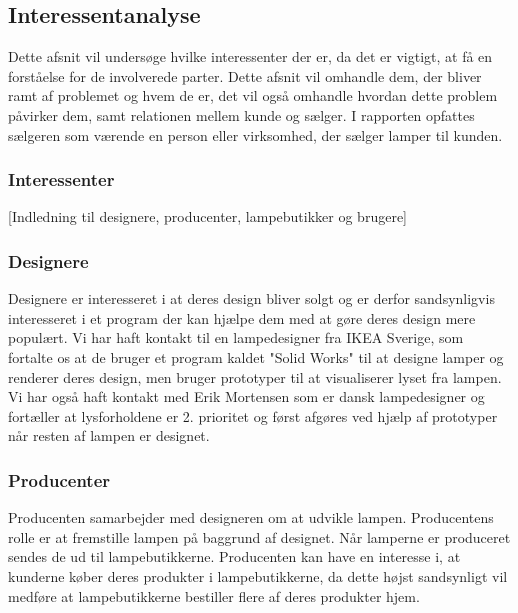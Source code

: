 \subsection{Interessentanalyse}
Dette afsnit vil undersøge hvilke interessenter der er, da det er vigtigt, at få en forståelse for de involverede parter. Dette afsnit vil omhandle dem, der bliver ramt af problemet og hvem de er, det vil også omhandle hvordan dette problem påvirker dem, samt relationen mellem kunde og sælger. I rapporten opfattes sælgeren som værende en person eller virksomhed, der sælger lamper til kunden. 

\subsubsection{Interessenter}


[Indledning til designere, producenter, lampebutikker og brugere]


\subsubsection{Designere}
Designere er interesseret i at deres design bliver solgt og er derfor sandsynligvis interesseret i et program der kan hjælpe dem med at gøre deres design mere populært.
Vi har haft kontakt til en lampedesigner fra IKEA Sverige, som fortalte os at de bruger et program kaldet "Solid Works"\cite{SolidWorks} til at designe lamper og renderer deres design, men bruger prototyper til at visualiserer lyset fra lampen\cite{sec:mailDavid}.
Vi har også haft kontakt med Erik Mortensen som er dansk lampedesigner og fortæller at lysforholdene er 2. prioritet og først afgøres ved hjælp af prototyper når resten af lampen er designet\cite{sec:mailErik}.

\subsubsection{Producenter}
Producenten samarbejder med designeren om at udvikle lampen. Producentens rolle er at fremstille lampen på baggrund af designet. Når lamperne er produceret sendes de ud til lampebutikkerne. Producenten kan have en interesse i, at kunderne køber deres produkter i lampebutikkerne, da dette højst sandsynligt vil medføre at lampebutikkerne bestiller flere af deres produkter hjem. 

